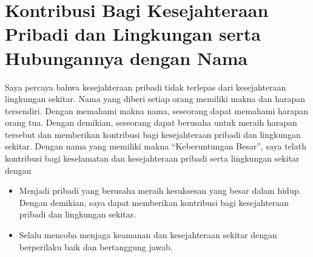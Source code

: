 \documentclass[a4paper]{article}
\begin{document}
\section*{Kontribusi Bagi Kesejahteraan Pribadi dan Lingkungan serta Hubungannya dengan Nama}
Saya percaya bahwa kesejahteraan pribadi tidak terlepas dari kesejahteraan lingkungan sekitar. Nama yang diberi setiap orang memiliki makna dan harapan tersendiri. Dengan memahami makna nama, seseorang dapat memahami harapan orang tua. Dengan demikian, seseorang dapat berusaha untuk meraih harapan tersebut dan memberikan kontribusi bagi kesejahteraan pribadi dan lingkungan sekitar. Dengan nama yang memiliki makna ``Keberuntungan Besar'', saya telath kontribusi bagi keselamatan dan kesejahteraan pribadi serta lingkungan sekitar dengan
\begin{itemize}
    \item Menjadi pribadi yang berusaha meraih kesuksesan yang besar dalam hidup. Dengan demikian, saya dapat memberikan kontribusi bagi kesejahteraan pribadi dan lingkungan sekitar.
    \item Selalu mencoba menjaga keamanan dan kesejahteraan sekitar dengan berperilaku baik dan bertanggung jawab.
\end{itemize}
\end{document}
